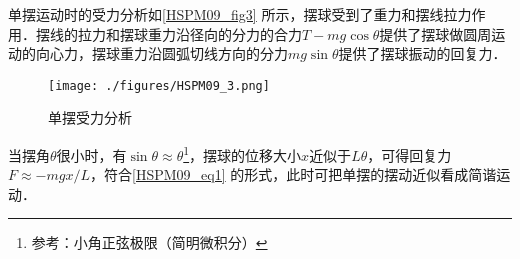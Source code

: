 单摆运动时的受力分析如\autoref{HSPM09_fig3} 所示，摆球受到了重力和摆线拉力作用．摆线的拉力和摆球重力沿径向的分力的合力$T-mg\cos\theta$提供了摆球做圆周运动的向心力，摆球重力沿圆弧切线方向的分力$mg\sin\theta$提供了摆球振动的回复力．

\begin{figure}[ht]
\centering
\texttt{[image: ./figures/HSPM09\_3.png]}
\caption{单摆受力分析} \label{HSPM09_fig3}
\end{figure}

当摆角$\theta$很小时，有$\sin\theta \approx \theta$\footnote{参考：小角正弦极限（简明微积分）}，摆球的位移大小$x$近似于$L\theta$，可得回复力$F \approx -mgx/L$，符合\autoref{HSPM09_eq1} 的形式，此时可把单摆的摆动近似看成简谐运动．